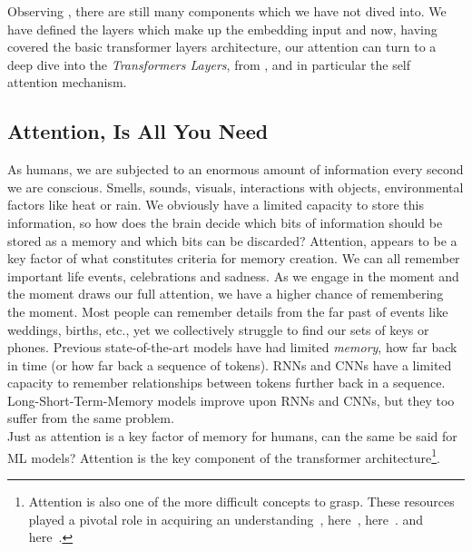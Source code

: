 Observing , there are still many components which we have not dived into. We have defined the
layers which make up the embedding input and now, having covered the basic transformer layers architecture,
our attention can turn to a deep dive into the \emph{Transformers Layers}, from , and in
particular the self attention mechanism.

\subsection{Attention, Is All You Need}
\label{sec:attention}
As humans, we are subjected to an enormous amount of information every second we are conscious. Smells, sounds,
visuals, interactions with objects, environmental factors like heat or rain. We obviously have a limited capacity to store
this information, so how does the brain decide which bits of information should be stored as a memory and which
bits can be discarded?
\bigbreak
Attention, appears to be a key factor of what constitutes criteria for memory creation. We can all remember important life events,
celebrations and sadness. As we engage in the moment and the moment draws our full attention, we have a higher chance of remembering
the moment. Most people can remember details from the far past of events like weddings, births, etc., yet we collectively struggle to find our sets of keys or phones.
\bigbreak
Previous state-of-the-art models have had limited \emph{memory}, how far back in time (or how far back a sequence of tokens).
RNNs and CNNs have a limited capacity to remember relationships between tokens further back in a sequence. Long-Short-Term-Memory models
improve upon RNNs and CNNs, but they too suffer from the same problem.\\
\bigbreak
Just as attention is a key factor of memory for humans, can the same be said for ML models?
\bigbreak
Attention is the key component of the transformer architecture\footnote{Attention is also one of the more difficult concepts to grasp. These resources
	played a pivotal role in acquiring an understanding~\autocite{doshiTransformersExplainedVisually2021b}, here~\autocite{doshiTransformersExplainedVisually2021a},
	here~\autocite{cristinaTransformerAttentionMechanism2021}.
	and here~\autocite{alammarIllustratedTransformer}.}.
